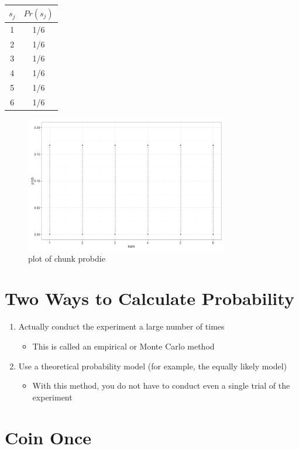 \documentclass[12pt]{article}
\begin{document}
\begin{longtable}[c]{@{}cc@{}}
\toprule
\(s_{j}\) & \(Pr(s_{j})\)\tabularnewline
\midrule
\endhead
1 & 1/6\tabularnewline
2 & 1/6\tabularnewline
3 & 1/6\tabularnewline
4 & 1/6\tabularnewline
5 & 1/6\tabularnewline
6 & 1/6\tabularnewline
\bottomrule
\end{longtable}

\begin{figure}[H]
\centering
\includegraphics[width=3.5in]{figure/probdie-1.png}
\caption{plot of chunk probdie}
\end{figure}

\section{Two Ways to Calculate
Probability}\label{two-ways-to-calculate-probability}

\begin{enumerate}
\def\labelenumi{\arabic{enumi}.}
\itemsep1pt\parskip0pt
\item
  Actually conduct the experiment a large number of times

  \begin{itemize}
  \itemsep1pt\parskip0pt
  \item
    This is called an empirical or Monte Carlo method
  \end{itemize}
\item
  Use a theoretical probability model (for example, the equally likely
  model)

  \begin{itemize}
  \itemsep1pt\parskip0pt
  \item
    With this method, you do not have to conduct even a single trial of
    the experiment
  \end{itemize}
\end{enumerate}

\section{Coin Once}\label{coin-once}
\end{document}
